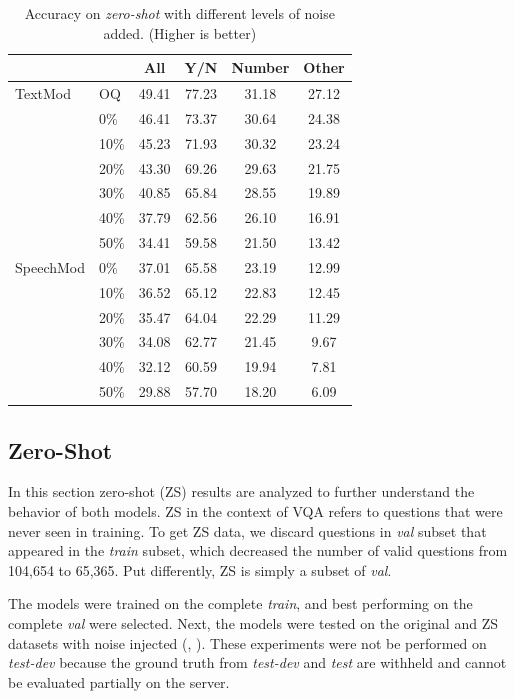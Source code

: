 \documentclass[letterpaper]{article} %
\begin{document}
\begin{table}[t]
\centering
\caption{Accuracy on \textit{zero-shot} with different levels of noise added. (Higher is better)}
\label{table:zs}
\begin{tabular}{ll|cccc}
          &                     & All    & Y/N    & Number & Other \\ \hline
TextMod   & OQ                  & 49.41  & 77.23  & 31.18  & 27.12 \\
          & 0\%                 & 46.41  & 73.37  & 30.64  & 24.38 \\
          & 10\%                & 45.23  & 71.93  & 30.32  & 23.24 \\
          & 20\%                & 43.30  & 69.26  & 29.63  & 21.75 \\
          & 30\%                & 40.85  & 65.84  & 28.55  & 19.89 \\
          & 40\%                & 37.79  & 62.56  & 26.10  & 16.91 \\
          & 50\%                & 34.41  & 59.58  & 21.50  & 13.42 \\ \hline
SpeechMod & 0\%                 & 37.01  & 65.58  & 23.19  & 12.99 \\
          & 10\%                & 36.52  & 65.12  & 22.83  & 12.45 \\
          & 20\%                & 35.47  & 64.04  & 22.29  & 11.29 \\
          & 30\%                & 34.08  & 62.77  & 21.45  &  9.67 \\
          & 40\%                & 32.12  & 60.59  & 19.94  &  7.81 \\
          & 50\%                & 29.88  & 57.70  & 18.20  &  6.09 
\end{tabular}
\end{table}


\subsection{Zero-Shot}
In this section zero-shot (ZS) results are analyzed to further understand the behavior of both models. ZS in the context of VQA refers to questions that were never seen in training. To get ZS data, we discard questions in \textit{val} subset that appeared in the \textit{train} subset, which decreased the number of valid questions from 104,654 to 65,365. Put differently, ZS is simply a subset of \textit{val}.

The models were trained on the complete \textit{train}, and best performing on the complete \textit{val} were selected. Next, the models were tested on the original and ZS datasets with noise injected (, ). These experiments were not be performed on \textit{test-dev} because the ground truth from \textit{test-dev} and \textit{test} are withheld and cannot be evaluated partially on the server.
\end{document}
